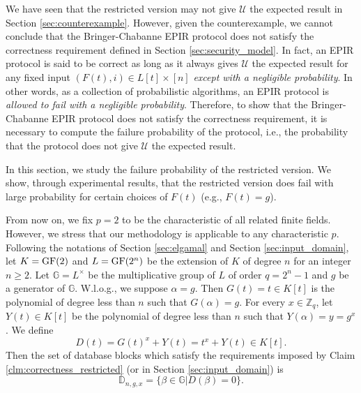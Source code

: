 \documentclass[JMC]{degruyter-journal}
\begin{document}
We have seen that the restricted version  may not give $\mathcal{U}$ the expected
result in Section \ref{sec:counterexample}. However, given the counterexample, we cannot conclude that
the Bringer-Chabanne EPIR protocol does not satisfy the correctness requirement defined in
Section \ref{sec:security_model}.
In fact, an EPIR protocol is said to be correct as long as it always gives $\mathcal{U}$ the expected
result for any fixed input $(F(t),i)\in L[t]\times [n]$ {\em except with a negligible probability}.
In other words, as a collection of probabilistic algorithms,
an EPIR protocol is {\em allowed to fail with a negligible probability}.
Therefore, to show that the Bringer-Chabanne EPIR protocol
does not satisfy the correctness requirement, it is necessary to compute the failure probability
of the protocol, i.e.,
the probability that
the protocol  does not give $\mathcal{U}$ the expected result.

In this section, we  study the
failure  probability of the restricted version. We show,
through  experimental results,  that the restricted version  does fail with large
probability for certain choices of $F(t)$ (e.g.,  $F(t)=g$).


From now on, we fix $p=2$ to be the characteristic of all related
finite fields. However, we stress that our methodology is applicable
to any characteristic
 $p$.
Following the notations of Section \ref{sec:elgamal} and Section 
\ref{sec:input_domain}, let $K={\rm GF}(2)$  and
$L={\rm GF}(2^n)$ be the extension of $K$ of degree $n$ for an integer  $n\geq 2$.
  Let $\mathbb{G}=L^{\times}$ be the multiplicative group
of $L$ of order $q=2^n-1$ and $g$ be a generator of $\mathbb{G}$.
W.l.o.g., we suppose $\alpha=g$. Then $G(t)=t\in K[t]$ is the
polynomial of degree less than $n$ such that $G(\alpha)=g$.
 For every $x\in \mathbb{Z}_q$, let $Y(t)\in K[t]$ be the polynomial of degree less than $n$ such that
  $Y(\alpha)=y=g^x$.
We define
\begin{equation*}\label{eqn:D_t}
D(t)=G(t)^x+Y(t)=t^x+Y(t)\in K[t].
\end{equation*}
Then the set of database blocks which satisfy the requirements
imposed by Claim \ref{clm:correctness_restricted} (or in Section
\ref{sec:input_domain})  is
\begin{equation*}\label{eqn:D_ngx}
\mathbb{D}_{n,g,x}=\{\beta\in \mathbb{G}| D(\beta)=0\}.
\end{equation*}
\end{document}
